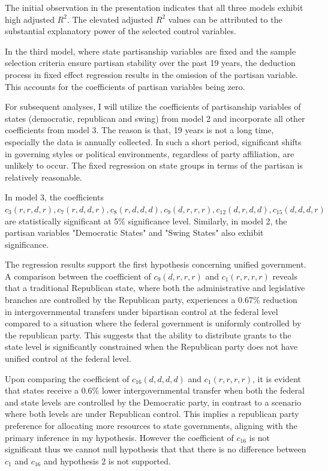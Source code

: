 \documentclass[man]{apa7}
\begin{document}
The initial observation in the presentation indicates that all three models exhibit high adjusted $R^2$. The elevated adjusted $R^2$ values can be attributed to the substantial explanatory power of the selected control variables.

In the third model, where state partisanship variables are fixed and the sample selection criteria ensure partisan stability over the past 19 years, the deduction process in fixed effect regression results in the omission of the partisan variable. This accounts for the coefficients of partisan variables being zero.

For subsequent analyses, I will utilize the coefficients of partisanship variables of states (democratic, republican and swing) from model 2 and incorporate all other coefficients from model 3. The reason is that, 19 years is not a long time, especially the data is annually collected. In such a short period, significant shifts in governing styles or political environments, regardless of party affiliation, are unlikely to occur. The fixed regression on state groups in terms of the partisan is relatively reasonable.


In model 3, the coefficients $c_3(r, r, d, r),c_7(r, d, d, r),c_8(r, d, d, d),c_9(d, r, r, r),c_{12}(d, r, d, d),c_{15}(d, d, d, r)$ are statistically significant at 5\% significance level. Similarly, in model 2, the partisan variables "Democratic States" and "Swing States" also exhibit significance.

The regression results support the first hypothesis concerning unified government. A comparison between the coefficient of $c_9(d, r, r, r)$ and $c_1(r, r, r, r)$ reveals that a traditional Republican state, where both the administrative and legislative branches are controlled by the Republican party, experiences a 0.67\% reduction in intergovernmental transfers under bipartisan control at the federal level compared to a situation where the federal government is uniformly controlled by the republican party. This suggests that the ability to distribute grants to the state level is significantly constrained when the Republican party does not have unified control at the federal level.


Upon comparing the coefficient of $c_{16}(d, d, d, d)$ and $c_1(r, r, r, r)$, it is evident that states receive a 0.6\% lower intergovernmental transfer when both the federal and state levels are controlled by the Democratic party, in contrast to a scenario where both levels are under Republican control. This implies a republican party preference for allocating more resources to state governments, aligning with the primary inference in my hypothesis. However the coefficient of $c_{16}$ is not significant thus we cannot null hypothesis that that there is no difference between $c_1$ and $c_{16}$ and hypothesis 2 is not supported.
\end{document}
